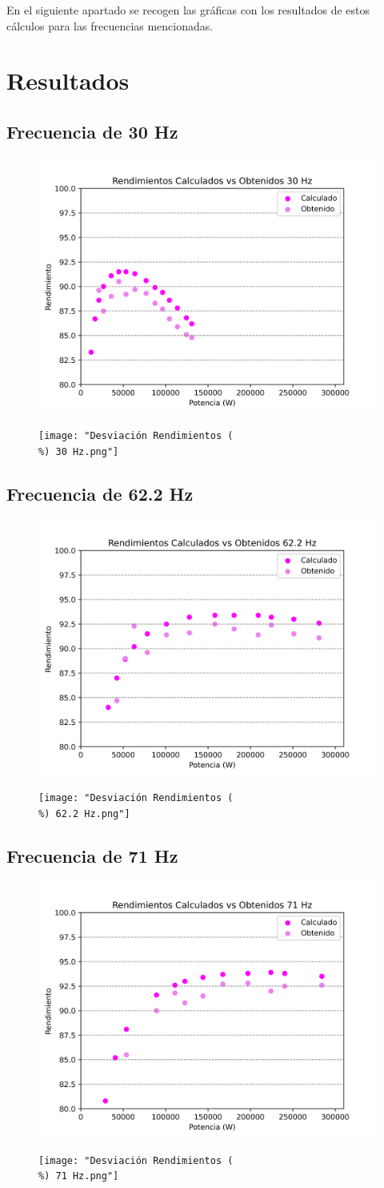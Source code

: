 \documentclass[12pt]{article}
\begin{document}
En el siguiente apartado se recogen las gráficas con los resultados de estos cálculos para las frecuencias mencionadas.
\section{Resultados}
\subsection{Frecuencia de 30 Hz}
\begin{figure}[H]
\centering
\includegraphics[width=0.6	extwidth]{"Rendimientos Calculados vs Obtenidos 30 Hz.png"}
\caption{}
\label{fig:}
\end{figure}
\begin{figure}[H]
\centering
\texttt{[image: "Desviación Rendimientos (\\\%) 30 Hz.png"]}
\caption{}
\label{fig:}
\end{figure}

\subsection{Frecuencia de 62.2 Hz}
\begin{figure}[H]
\centering
\includegraphics[width=0.6	extwidth]{"Rendimientos Calculados vs Obtenidos 62.2 Hz.png"}
\caption{}
\label{fig:}
\end{figure}
\begin{figure}[H]
\centering
\texttt{[image: "Desviación Rendimientos (\\\%) 62.2 Hz.png"]}
\caption{}
\label{fig:}
\end{figure}

\subsection{Frecuencia de 71 Hz}
\begin{figure}[H]
\centering
\includegraphics[width=0.6	extwidth]{"Rendimientos Calculados vs Obtenidos 71 Hz.png"}
\caption{}
\label{fig:}
\end{figure}
\begin{figure}[H]
\centering
\texttt{[image: "Desviación Rendimientos (\\\%) 71 Hz.png"]}
\caption{}
\label{fig:}
\end{figure}
\end{document}
